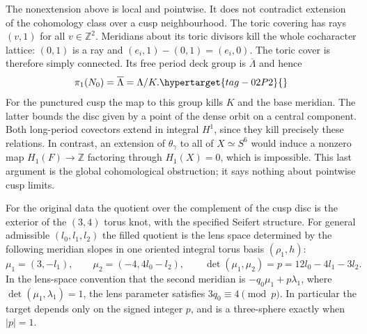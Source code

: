 The nonextension above is local and pointwise.  It does not
contradict extension of the cohomology class over a cusp
neighbourhood.  The toric covering has rays $(v,1)$ for all
$v\in\mathbb Z^2$.  Meridians about its toric divisors kill
the whole cocharacter lattice: $(0,1)$ is a ray and
$(e_i,1)-(0,1)=(e_i,0)$.  The toric cover is therefore simply
connected.  Its free period deck group is $\overline\Lambda$
and hence
\[
 \pi_1(N_0)=\overline\Lambda=\Lambda/K.
 \hypertarget{tag-02P2}{}\label{mapsI:quotient-eq-5}
\]
For the punctured cusp the map to this group kills $K$ and
the base meridian.  The latter bounds the disc given by a
point of the dense orbit on a central component.  Both
long-period covectors extend in integral $H^1$, since they
kill precisely these relations.  In contrast, an extension
of $\theta_\gamma$ to all of $X\simeq S^6$ would induce a
nonzero map $H_1(F)\to\mathbb Z$ factoring through
$H_1(X)=0$, which is impossible.  This last argument is the
global cohomological obstruction; it says nothing about
pointwise cusp limits.

\begin{proposition}\hypertarget{tag-02PC}{}\label{mapsI:src:A.1.3}

For the original data the quotient over the complement of
the cusp disc is the exterior of the $(3,4)$ torus knot,
with the specified Seifert structure.  For general admissible
$(l_0,l_1,l_2)$ the filled quotient is the lens space determined
by the following meridian slopes in one oriented integral
torus basis $(\rho_1,h)$:
\[
 \mu_1=(3,-l_1),\qquad
 \mu_2=(-4,4l_0-l_2),\qquad
 \det(\mu_1,\mu_2)=p=12l_0-4l_1-3l_2.
 \label{mapsI:quotient-eq-6}
\]
In the lens-space convention that the second meridian is
$-q_0\mu_1+p\lambda_1$, where
$\det(\mu_1,\lambda_1)=1$, the lens parameter satisfies
$3q_0\equiv4\pmod p$.  In particular the target depends only
on the signed integer $p$, and is a three-sphere exactly
when $|p|=1$.
\end{proposition}



